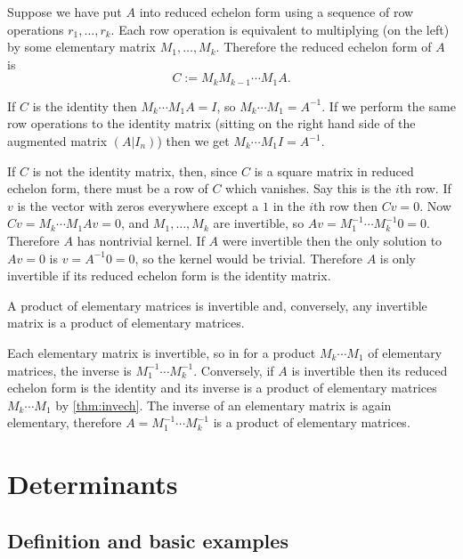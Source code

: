 \documentclass{article}
\begin{document}
\begin{Proof}\label{prf:invech}
Suppose we have put \(A\) into reduced echelon form using a sequence
of row operations \(r_1,\ldots,r_k\). Each row operation is
equivalent to multiplying (on the left) by some elementary matrix
\(M_1,\ldots,M_k\). Therefore the reduced echelon form of \(A\) is
\[C:=M_kM_{k-1}\cdots M_1A.\]


If \(C\) is the identity then \(M_k\cdots M_1A=I\), so \(M_k\cdots
M_1=A^{-1}\). If we perform the same row operations to the identity
matrix (sitting on the right hand side of the augmented matrix
\((A|I_n)\)) then we get \(M_k\cdots M_1I=A^{-1}\).


If \(C\) is not the identity matrix, then, since \(C\) is a square
matrix in reduced echelon form, there must be a row of \(C\) which
vanishes. Say this is the \(i\)th row. If \(v\) is the vector with
zeros everywhere except a \(1\) in the \(i\)th row then
\(Cv=0\). Now \(Cv=M_k\cdots M_1Av=0\), and \(M_1,\ldots,M_k\) are
invertible, so \(Av=M_1^{-1}\cdots M_k^{-1}0=0\). Therefore \(A\)
has nontrivial kernel. If \(A\) were invertible then the only
solution to \(Av=0\) is \(v=A^{-1}0=0\), so the kernel would be
trivial. Therefore \(A\) is only invertible if its reduced echelon
form is the identity matrix. \qedhere


\end{Proof}
\begin{Corollary}\label{cor:invprodelem}
A product of elementary matrices is invertible and, conversely, any
invertible matrix is a product of elementary matrices.
\end{Corollary}
\begin{Proof}
Each elementary matrix is invertible, so in for a product
\(M_k\cdots M_1\) of elementary matrices, the inverse is
\(M_1^{-1}\cdots M_k^{-1}\). Conversely, if \(A\) is invertible then
its reduced echelon form is the identity and its inverse is a
product of elementary matrices \(M_k\cdots M_1\) by
\cref{thm:invech}. The inverse of an elementary matrix is again
elementary, therefore \(A=M_1^{-1}\cdots M_k^{-1}\) is a product of
elementary matrices. \qedhere


\end{Proof}
\clearpage
\section{Determinants}
\subsection{Definition and basic examples}
\end{document}
